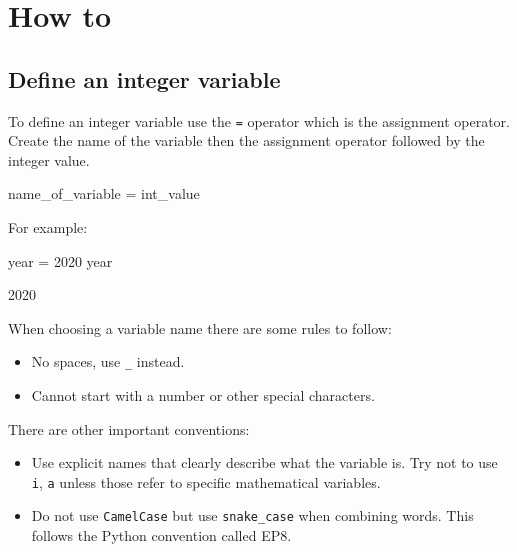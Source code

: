 \section{How to}
\label{\detokenize{building-tools/01-variables-conditionals-loops/how/main:how}}\label{\detokenize{building-tools/01-variables-conditionals-loops/how/main::doc}}

\subsection{Define an integer variable}
\label{\detokenize{building-tools/01-variables-conditionals-loops/how/main:define-an-integer-variable}}

To define an integer variable use the \texttt{=} operator which is the assignment
operator. Create the name of the variable then the assignment operator
followed by the integer value.


\begin{api}
name_of_variable = int_value
\end{api}



For example:




\begin{pyin}
year = 2020
year
\end{pyin}





\begin{raw}
2020
\end{raw}


\begin{note}
When choosing a variable name there are some rules to follow:
\begin{itemize}
\item 

No spaces, use \texttt{\_} instead.

\item 

Cannot start with a number or other special characters.

\end{itemize}


There are other important conventions:
\begin{itemize}
\item 

Use explicit names that clearly describe what the variable is. Try not to use
\texttt{i}, \texttt{a} unless those refer to specific mathematical variables.

\item 

Do not use \texttt{CamelCase} but use \texttt{snake\_case} when combining words. This follows
the Python convention called EP8.

\end{itemize}
\end{note}



